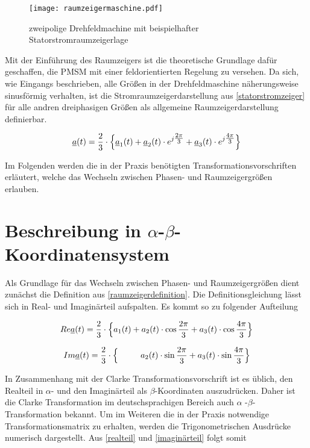 \begin{figure}[h]
	\centering
	\texttt{[image: raumzeigermaschine.pdf]}
	\label{fig:raumzeigermaschine}
	\caption{zweipolige Drehfeldmachine mit beispielhafter Statorstromraumzeigerlage}
\end{figure}

Mit der Einführung des Raumzeigers ist die theoretische Grundlage dafür geschaffen, die PMSM mit einer feldorientierten Regelung zu versehen. 
Da sich, wie Eingangs beschrieben, alle Größen in der Drehfeldmaschine näherungsweise sinusförmig verhalten, ist die Stromraumzeigerdarstellung aus \ref{statorstromzeiger} für alle andren dreiphasigen Größen als allgemeine Raumzeigerdarstellung definierbar.

\begin{align}
	\underline{a}(t) = \frac{2}{3} \cdot \Bigl\{\underline{a}_{1}(t) + \underline{a}_{2}(t)\cdot e^{j\tfrac{2\pi}{3}} + \underline{a}_{3}(t)\cdot e^{j\tfrac{4\pi}{3}} \Bigr\} \label{raumzeigerdefinition}
\end{align}

Im Folgenden werden die in der Praxis benötigten Transformationsvorschriften erläutert, welche das Wechseln zwischen Phasen- und Raumzeigergrößen erlauben.


\section{Beschreibung in $\alpha$-$\beta$-Koordinatensystem}\label{sec:clark}

Als Grundlage für das Wechseln zwischen Phasen- und Raumzeigergrößen dient zunächst die Definition aus \ref{raumzeigerdefinition}. Die Definitionsgleichung lässt sich in Real- und Imaginärteil aufspalten. Es kommt so zu folgender Aufteilung

\begin{align}
	Re{\underline{a}(t)} = \frac{2}{3} \cdot \Bigl\{ a_{1}(t) + a_{2}(t) \cdot\cos{\frac{2 \pi}{3}} + a_{3}(t) \cdot\cos{\frac{4 \pi}{3}} \Bigr\}
	\label{realteil}
\end{align}

\begin{align}
	Im{\underline{a}(t)} = \frac{2}{3} \cdot \Bigl\{ ~~~~~~~~a_{2}(t)\cdot\sin{\frac{2 \pi}{3}} + a_{3}(t) \cdot\sin{\frac{4 \pi}{3}} \Bigr\}
	\label{imaginärteil}
\end{align}

In Zusammenhang mit der Clarke Transformationsvorschrift ist es üblich, den Realteil in $\alpha$- und den Imaginärteil als $\beta$-Koordinaten auszudrücken. 
Daher ist die Clarke Transformation im deutschsprachigen Bereich auch $\alpha$ -$\beta$-Transformation bekannt.
Um im Weiteren die in der Praxis notwendige Transformationsmatrix zu erhalten, werden die Trigonometrischen Ausdrücke numerisch dargestellt. 
Aus \ref{realteil} und \ref{imaginärteil} folgt somit

